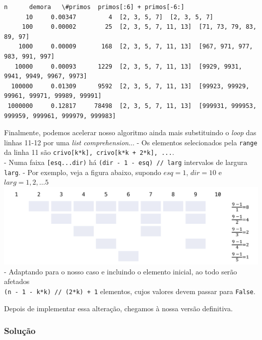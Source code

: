 \documentclass[11pt,a4paper]{article}
\makeatletter
\def\maxwidth{\ifdim\Gin@nat@width>\linewidth\linewidth
    \else\Gin@nat@width\fi}
\let\Oldincludegraphics\includegraphics
\renewcommand{\includegraphics}[1]{\Oldincludegraphics[width=.8\maxwidth]{#1}}
\makeatother
\begin{document}
    \begin{Verbatim}[commandchars=\\\{\}]
       n      demora   \#primos  primos[:6] + primos[-6:]
      10     0.00347         4  [2, 3, 5, 7]  [2, 3, 5, 7]
     100     0.00002        25  [2, 3, 5, 7, 11, 13]  [71, 73, 79, 83, 89, 97]
    1000     0.00009       168  [2, 3, 5, 7, 11, 13]  [967, 971, 977, 983, 991, 997]
   10000     0.00093      1229  [2, 3, 5, 7, 11, 13]  [9929, 9931, 9941, 9949, 9967, 9973]
  100000     0.01309      9592  [2, 3, 5, 7, 11, 13]  [99923, 99929, 99961, 99971, 99989, 99991]
 1000000     0.12817     78498  [2, 3, 5, 7, 11, 13]  [999931, 999953, 999959, 999961, 999979, 999983]

    \end{Verbatim}

    Finalmente, podemos acelerar nosso algoritmo ainda mais substituindo o
\emph{loop} das linhas 11-12 por uma \emph{list comprehension}... - Os
elementos selecionados pela \texttt{range} da linha 11 são
\texttt{crivo{[}k*k{]},\ crivo{[}k*k\ +\ 2*k{]},\ ...}.\\
- Numa faixa \texttt{{[}esq...dir)} há
\texttt{(dir\ -\ 1\ -\ esq)\ //\ larg} intervalos de largura
\texttt{larg}. - Por exemplo, veja a figura abaixo, supondo \(esq = 1\),
\(dir = 10\) e \(larg = 1, 2, \dots5\)\\
\includegraphics{img/intervalos.png} - Adaptando para o nosso caso e
incluindo o elemento inicial, ao todo serão afetados\\
\texttt{(n\ -\ 1\ -\ k*k)\ //\ (2*k)\ +\ 1} elementos, cujos valores
devem passar para \texttt{False}.

Depois de implementar essa alteração, chegamos à nossa versão
definitiva.

\pagebreak
\subsubsection{Solução}\label{soluuxe7uxe3o}
\end{document}
